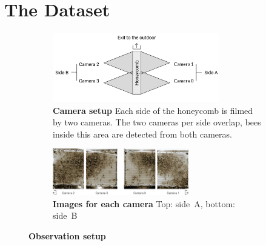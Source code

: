 \section{The Dataset}
\label{sec:dataset}

\begin{figure}
    \centering
    \begin{subfigure}[b]{\textwidth}
	\centering
	\includegraphics[width=0.8\textwidth]{Figures/setupCams}
	\caption[Camera setup]{\textbf{Camera setup} Each side of the honeycomb is filmed by two cameras. The two cameras per side overlap, bees inside this area are detected from both cameras.}
	\label{fig:cams}
	\vspace{5mm}
    \end{subfigure}
    \begin{subfigure}[b]{\textwidth}
	\centering
	\includegraphics[width=0.65\textwidth]{Figures/beesClose}
	\vspace{5mm}
	\caption[Images for each camera]{\textbf{Images for each camera} Top: side~A, bottom: side~B}
	\label{fig:veryclose}
    \end{subfigure}
 	\caption[Observation setup]{\textbf{Observation setup}}
 	\label{fig:obssetup}
\end{figure}

